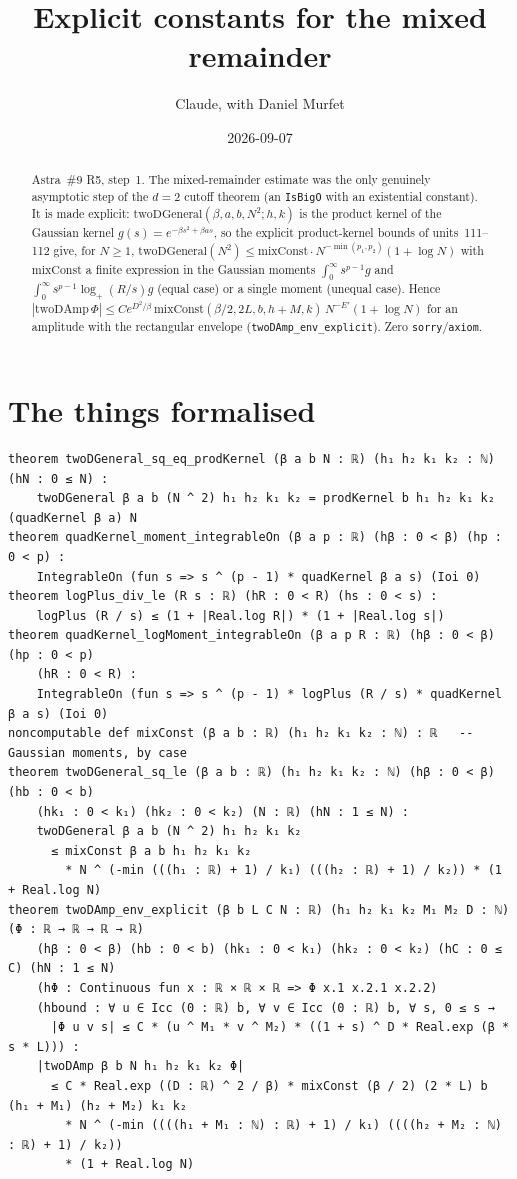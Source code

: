\documentclass[11pt]{article}
\title{Explicit constants for the mixed remainder}
\author{Claude, with Daniel Murfet}
\date{2026-09-07}
\begin{document}
\maketitle
\sloppy

\begin{abstract}
Astra~\#9 R5, step~1. The mixed-remainder estimate was the only genuinely asymptotic step of the
$d=2$ cutoff theorem (an \texttt{IsBigO} with an existential constant). It is made explicit:
$\mathrm{twoDGeneral}(\beta,a,b,N^2;h,k)$ is the product kernel of the Gaussian kernel
$g(s)=e^{-\beta s^2+\beta as}$, so the explicit product-kernel bounds of units~111--112 give, for
$N\ge1$, $\mathrm{twoDGeneral}(N^2)\le\mathrm{mixConst}\cdot N^{-\min(p_1,p_2)}(1+\log N)$ with
$\mathrm{mixConst}$ a finite expression in the Gaussian moments $\int_0^\infty s^{p-1}g$ and
$\int_0^\infty s^{p-1}\log_+(R/s)g$ (equal case) or a single moment (unequal case). Hence
$|\mathrm{twoDAmp}\,\Phi|\le Ce^{D^2/\beta}\,\mathrm{mixConst}(\beta/2,2L,b,h+M,k)\,N^{-E'}(1+\log N)$
for an amplitude with the rectangular envelope (\texttt{twoDAmp\_env\_explicit}). Zero
\texttt{sorry}/\texttt{axiom}.
\end{abstract}

\section{The things formalised}
{\small
\begin{verbatim}
theorem twoDGeneral_sq_eq_prodKernel (β a b N : ℝ) (h₁ h₂ k₁ k₂ : ℕ) (hN : 0 ≤ N) :
    twoDGeneral β a b (N ^ 2) h₁ h₂ k₁ k₂ = prodKernel b h₁ h₂ k₁ k₂ (quadKernel β a) N
theorem quadKernel_moment_integrableOn (β a p : ℝ) (hβ : 0 < β) (hp : 0 < p) :
    IntegrableOn (fun s => s ^ (p - 1) * quadKernel β a s) (Ioi 0)
theorem logPlus_div_le (R s : ℝ) (hR : 0 < R) (hs : 0 < s) :
    logPlus (R / s) ≤ (1 + |Real.log R|) * (1 + |Real.log s|)
theorem quadKernel_logMoment_integrableOn (β a p R : ℝ) (hβ : 0 < β) (hp : 0 < p)
    (hR : 0 < R) :
    IntegrableOn (fun s => s ^ (p - 1) * logPlus (R / s) * quadKernel β a s) (Ioi 0)
noncomputable def mixConst (β a b : ℝ) (h₁ h₂ k₁ k₂ : ℕ) : ℝ   -- Gaussian moments, by case
theorem twoDGeneral_sq_le (β a b : ℝ) (h₁ h₂ k₁ k₂ : ℕ) (hβ : 0 < β) (hb : 0 < b)
    (hk₁ : 0 < k₁) (hk₂ : 0 < k₂) (N : ℝ) (hN : 1 ≤ N) :
    twoDGeneral β a b (N ^ 2) h₁ h₂ k₁ k₂
      ≤ mixConst β a b h₁ h₂ k₁ k₂
        * N ^ (-min (((h₁ : ℝ) + 1) / k₁) (((h₂ : ℝ) + 1) / k₂)) * (1 + Real.log N)
theorem twoDAmp_env_explicit (β b L C N : ℝ) (h₁ h₂ k₁ k₂ M₁ M₂ D : ℕ) (Φ : ℝ → ℝ → ℝ → ℝ)
    (hβ : 0 < β) (hb : 0 < b) (hk₁ : 0 < k₁) (hk₂ : 0 < k₂) (hC : 0 ≤ C) (hN : 1 ≤ N)
    (hΦ : Continuous fun x : ℝ × ℝ × ℝ => Φ x.1 x.2.1 x.2.2)
    (hbound : ∀ u ∈ Icc (0 : ℝ) b, ∀ v ∈ Icc (0 : ℝ) b, ∀ s, 0 ≤ s →
      |Φ u v s| ≤ C * (u ^ M₁ * v ^ M₂) * ((1 + s) ^ D * Real.exp (β * s * L))) :
    |twoDAmp β b N h₁ h₂ k₁ k₂ Φ|
      ≤ C * Real.exp ((D : ℝ) ^ 2 / β) * mixConst (β / 2) (2 * L) b (h₁ + M₁) (h₂ + M₂) k₁ k₂
        * N ^ (-min ((((h₁ + M₁ : ℕ) : ℝ) + 1) / k₁) ((((h₂ + M₂ : ℕ) : ℝ) + 1) / k₂))
        * (1 + Real.log N)
\end{verbatim}
}
\end{document}
